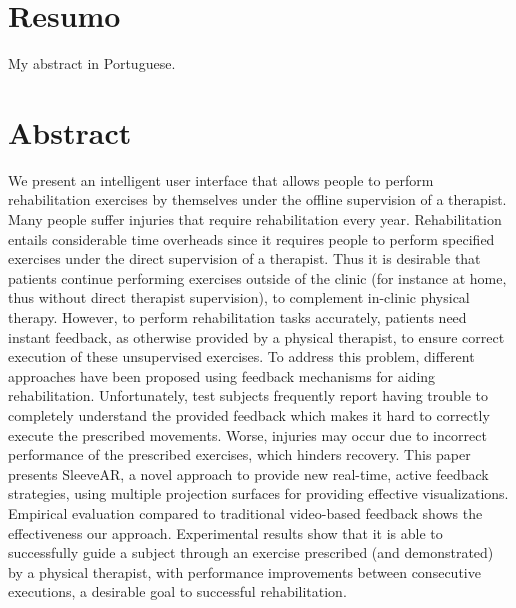 \cleardoublepage


\chapter*{Resumo}
\thispagestyle{empty}
 
My abstract in Portuguese.

\newpage


\chapter*{Abstract}
\thispagestyle{empty}

We present an intelligent user interface that allows people to perform rehabilitation exercises by themselves under the offline supervision of a therapist.  Many people suffer injuries that require rehabilitation every year. Rehabilitation entails considerable time overheads since it requires people to perform specified exercises under the direct supervision of a therapist. Thus it is desirable that patients continue performing exercises outside of the clinic (for instance at home, thus without direct therapist supervision), to complement in-clinic physical therapy.
However, to perform rehabilitation tasks accurately, patients need instant feedback, as otherwise provided by a physical therapist, to ensure correct execution of these unsupervised exercises. 
To address this problem, different approaches have been proposed using feedback mechanisms for aiding rehabilitation. 
Unfortunately, test subjects frequently report having trouble to completely understand the provided feedback which makes it hard to correctly execute the prescribed movements. 
Worse, injuries may occur due to incorrect performance of the prescribed exercises, which hinders recovery. This paper presents SleeveAR, a novel approach to provide new real-time, active feedback strategies, using multiple projection surfaces for providing effective visualizations.
Empirical evaluation compared to traditional video-based feedback shows the effectiveness our approach. Experimental results show that it is able to successfully guide a subject through an exercise prescribed (and demonstrated) by a physical therapist, with performance improvements between consecutive executions, a desirable goal to successful rehabilitation.


